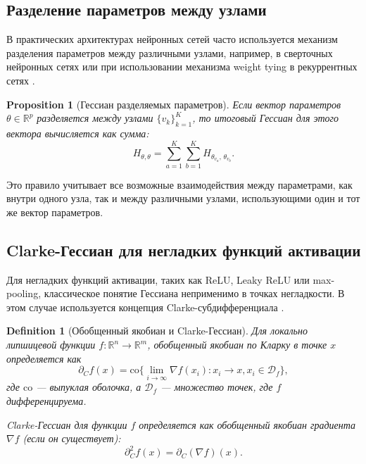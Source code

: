 \documentclass[11pt]{article}
\newtheorem{definition}{Definition}
\newtheorem{proposition}{Proposition}
\begin{document}
\subsection{Разделение параметров между узлами}

В практических архитектурах нейронных сетей часто используется механизм разделения параметров между
различными узлами, например, в сверточных нейронных сетях или при использовании механизма weight tying в
рекуррентных сетях \citep{pascanu2013difficulty}.

\begin{proposition}[Гессиан разделяемых параметров]
  Если вектор параметров $\theta\in\mathbb{R}^p$ разделяется между узлами $\{v_k\}_{k=1}^K$, то итоговый
  Гессиан для этого вектора вычисляется как сумма:
  \[
    H_{\theta,\theta}
    = \sum_{a=1}^K\sum_{b=1}^K
    H_{\theta_{v_a},\,\theta_{v_b}}.
  \]
\end{proposition}

Это правило учитывает все возможные взаимодействия между параметрами, как внутри одного узла, так и между
различными узлами, использующими один и тот же вектор параметров.

\subsection{Clarke-Гессиан для негладких функций активации}

Для негладких функций активации, таких как ReLU, Leaky ReLU или max-pooling, классическое понятие Гессиана
неприменимо в точках негладкости. В этом случае используется концепция Clarke-субдифференциала
\citep{clarke1990optimization}.

\begin{definition}[Обобщенный якобиан и Clarke-Гессиан]
  Для локально липшицевой функции $f: \mathbb{R}^n \to \mathbb{R}^m$, обобщенный якобиан по Кларку в точке
  $x$ определяется как
  \[
    \partial_C f(x) = \mathrm{co}\{\lim_{i\to\infty} \nabla f(x_i) : x_i \to x, x_i \in \mathcal{D}_f\},
  \]
  где $\mathrm{co}$ — выпуклая оболочка, а $\mathcal{D}_f$ — множество точек, где $f$ дифференцируема.

  Clarke-Гессиан для функции $f$ определяется как обобщенный якобиан градиента $\nabla f$ (если он существует):
  \[
    \partial_C^2 f(x) = \partial_C(\nabla f)(x).
  \]
\end{definition}
\end{document}
